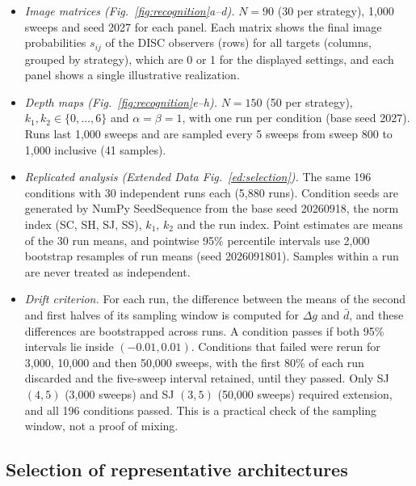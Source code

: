 \documentclass[10pt]{wlscirep}
\theoremstyle{plain}
\theoremstyle{remark}
\begin{document}
\begin{itemize}
\item \textit{Image matrices (Fig.~\ref{fig:recognition}a--d).} $N=90$ (30 per strategy), 1,000 sweeps and seed 2027 for each panel. Each matrix shows the final image probabilities $s_{ij}$ of the DISC observers (rows) for all targets (columns, grouped by strategy), which are 0 or 1 for the displayed settings, and each panel shows a single illustrative realization.
\item \textit{Depth maps (Fig.~\ref{fig:recognition}e--h).} $N=150$ (50 per strategy), $k_1,k_2\in\{0,\ldots,6\}$ and $\alpha=\beta=1$, with one run per condition (base seed 2027). Runs last 1,000 sweeps and are sampled every 5 sweeps from sweep 800 to 1,000 inclusive (41 samples).
\item \textit{Replicated analysis (Extended Data Fig.~\ref{ed:selection}).} The same 196 conditions with 30 independent runs each (5,880 runs). Condition seeds are generated by NumPy SeedSequence from the base seed 20260918, the norm index (SC, SH, SJ, SS), $k_1$, $k_2$ and the run index. Point estimates are means of the 30 run means, and pointwise 95\% percentile intervals use 2,000 bootstrap resamples of run means (seed 2026091801). Samples within a run are never treated as independent.
\item \textit{Drift criterion.} For each run, the difference between the means of the second and first halves of its sampling window is computed for $\Delta g$ and $\bar d$, and these differences are bootstrapped across runs. A condition passes if both 95\% intervals lie inside $(-0.01,0.01)$. Conditions that failed were rerun for 3,000, 10,000 and then 50,000 sweeps, with the first 80\% of each run discarded and the five-sweep interval retained, until they passed. Only SJ $(4,5)$ (3,000 sweeps) and SJ $(3,5)$ (50,000 sweeps) required extension, and all 196 conditions passed. This is a practical check of the sampling window, not a proof of mixing.
\end{itemize}

\subsection{Selection of representative architectures}
\end{document}
